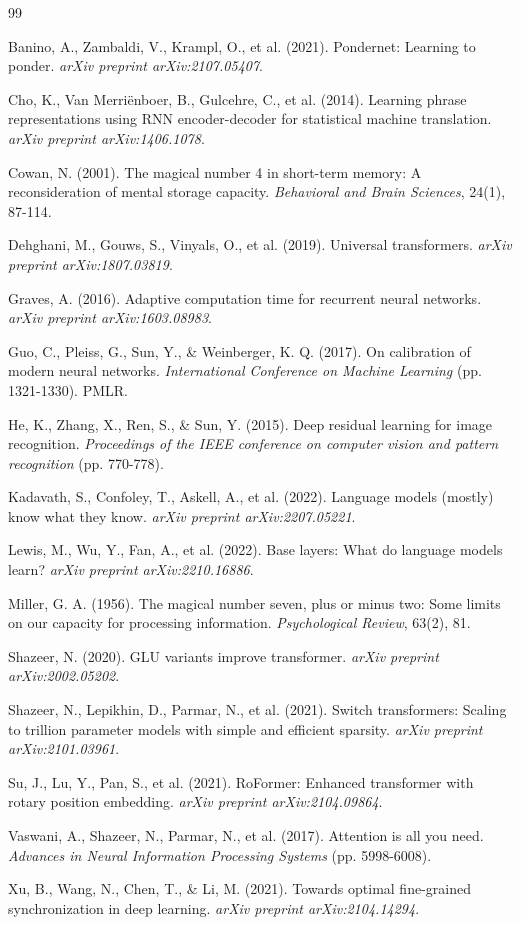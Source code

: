 \documentclass[11pt]{article}
\begin{document}
\begin{thebibliography}{99}

 Banino, A., Zambaldi, V., Krampl, O., et al. (2021). Pondernet: Learning to ponder. \textit{arXiv preprint arXiv:2107.05407}.

 Cho, K., Van Merriënboer, B., Gulcehre, C., et al. (2014). Learning phrase representations using RNN encoder-decoder for statistical machine translation. \textit{arXiv preprint arXiv:1406.1078}.

 Cowan, N. (2001). The magical number 4 in short-term memory: A reconsideration of mental storage capacity. \textit{Behavioral and Brain Sciences}, 24(1), 87-114.

 Dehghani, M., Gouws, S., Vinyals, O., et al. (2019). Universal transformers. \textit{arXiv preprint arXiv:1807.03819}.

 Graves, A. (2016). Adaptive computation time for recurrent neural networks. \textit{arXiv preprint arXiv:1603.08983}.

 Guo, C., Pleiss, G., Sun, Y., \& Weinberger, K. Q. (2017). On calibration of modern neural networks. \textit{International Conference on Machine Learning} (pp. 1321-1330). PMLR.

 He, K., Zhang, X., Ren, S., \& Sun, Y. (2015). Deep residual learning for image recognition. \textit{Proceedings of the IEEE conference on computer vision and pattern recognition} (pp. 770-778).

 Kadavath, S., Confoley, T., Askell, A., et al. (2022). Language models (mostly) know what they know. \textit{arXiv preprint arXiv:2207.05221}.

 Lewis, M., Wu, Y., Fan, A., et al. (2022). Base layers: What do language models learn? \textit{arXiv preprint arXiv:2210.16886}.

 Miller, G. A. (1956). The magical number seven, plus or minus two: Some limits on our capacity for processing information. \textit{Psychological Review}, 63(2), 81.

 Shazeer, N. (2020). GLU variants improve transformer. \textit{arXiv preprint arXiv:2002.05202}.

 Shazeer, N., Lepikhin, D., Parmar, N., et al. (2021). Switch transformers: Scaling to trillion parameter models with simple and efficient sparsity. \textit{arXiv preprint arXiv:2101.03961}.

 Su, J., Lu, Y., Pan, S., et al. (2021). RoFormer: Enhanced transformer with rotary position embedding. \textit{arXiv preprint arXiv:2104.09864}.

 Vaswani, A., Shazeer, N., Parmar, N., et al. (2017). Attention is all you need. \textit{Advances in Neural Information Processing Systems} (pp. 5998-6008).

 Xu, B., Wang, N., Chen, T., \& Li, M. (2021). Towards optimal fine-grained synchronization in deep learning. \textit{arXiv preprint arXiv:2104.14294}.

\end{thebibliography}
\end{document}
